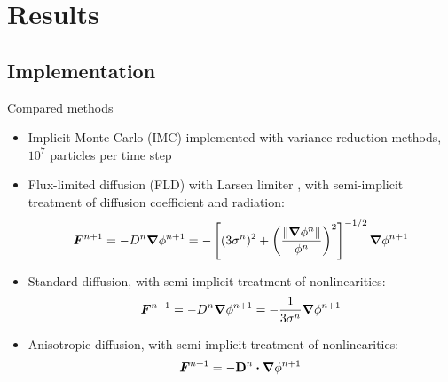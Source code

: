 \documentclass{beamer}
\begin{document}
\section{Results}
\subsection{Implementation}
\begin{frame}{Compared methods}
\begin{itemize}
  \item Implicit Monte Carlo (IMC) \cite{Fle1971} implemented with variance
    reduction methods, $10^7$ particles per time step
  \item {Fl}ux-limited diffusion (FLD) with Larsen limiter \cite{Ols2000}, with
    semi-implicit treatment of diffusion coefficient and radiation:
    \begin{equation*}
      \bm{F}^{n+1} = - D^{n} \bm{\nabla} \phi^{n+1}  = -\left[ (3\sigma^{n})^2
      + \left( \frac{\left\| \bm{\nabla} \phi^{n} \right\|}{\phi^{n}}  \right)^2 \right]^{-1/2}
      \bm{\nabla} \phi^{n+1}
    \end{equation*}
  \item Standard diffusion, with semi-implicit treatment of nonlinearities:
    \begin{equation*}
      \bm{F}^{n+1} = - D^{n} \bm{\nabla} \phi^{n+1} 
      = -\frac{1}{3\sigma^{n}} \bm{\nabla} \phi^{n+1}
    \end{equation*}
  \item Anisotropic diffusion, with semi-implicit treatment of nonlinearities:
    \begin{equation*}
      \bm{F}^{n+1} = -\mathbf{D}^{n}\bm{\cdot} \bm{\nabla} \phi^{n+1} 
    \end{equation*}
\end{itemize}
\end{frame}
\end{document}

